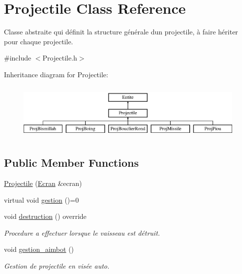 \hypertarget{class_projectile}{}\section{Projectile Class Reference}
\label{class_projectile}


Classe abstraite qui définit la structure générale d\textquotesingle{}un projectile, à faire hériter pour chaque projectile.  




{\ttfamily \#include $<$Projectile.\+h$>$}

Inheritance diagram for Projectile\+:\begin{figure}[H]
\begin{center}
\leavevmode
\includegraphics[height=2.823529cm]{class_projectile}
\end{center}
\end{figure}
\subsection*{Public Member Functions}
\begin{DoxyCompactItemize}
\item 
\mbox{\hyperlink{class_projectile_a34d60aa7b97b30b0fc29d8a2a05db4b5}{Projectile}} (\mbox{\hyperlink{class_ecran}{Ecran}} \&ecran)
\item 
virtual void \mbox{\hyperlink{class_projectile_ad8fae955389ff8944830e9d80e0f1ce1}{gestion}} ()=0
\item 
void \mbox{\hyperlink{class_projectile_a092690ef6f0f9284e05b775f26833c2d}{destruction}} () override
\begin{DoxyCompactList}\small\item\em Procedure a effectuer lorsque le vaisseau est détruit. \end{DoxyCompactList}\item 
void \mbox{\hyperlink{class_projectile_a89eac25ede6c308ef4bd9b1e676f7c6b}{gestion\+\_\+aimbot}} ()
\begin{DoxyCompactList}\small\item\em Gestion de projectile en visée auto. \end{DoxyCompactList}\end{DoxyCompactItemize}
